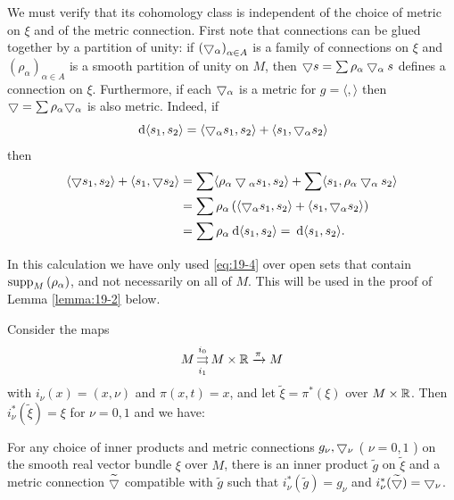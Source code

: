 We must verify that its cohomology class is independent of the choice of metric on $\xi$ and of the metric 
connection. First note that connections can be glued together by a partition of unity: 
if $\left(\bigtriangledown_{\alpha}\right)_{\alpha \in A}$ is a family of connections on $\xi$ 
and $\left(\rho_{\alpha}\right)_{\alpha \in A}$ is a smooth partition of unity on $M$, 
then $\bigtriangledown s=\sum \rho_{\alpha} \bigtriangledown_{\alpha} s$ defines a connection on $\xi$. Furthermore, if 
each $\bigtriangledown_\alpha$ is a metric for $g=\langle,\rangle$ then $\bigtriangledown=\sum \rho_{\alpha} \bigtriangledown_{\alpha}$ is also metric. 
Indeed, if
\begin{equation}\label{eq:19-4}
  \dd\langle s_{1}, s_{2}\rangle=\langle\btd{ }_{\alpha} s_{1}, s_{2}\rangle+\langle s_{1}, \btd{ }_{\alpha} s_{2}\rangle
\end{equation}
then
\[
  \begin{aligned}
    \langle\btd s_{1}, s_{2}\rangle+\langle s_{1}, \btd s_{2}\rangle 
      & = \sum\langle\rho_{\alpha} \btd{ }_{\alpha} s_{1}, s_{2}\rangle+\sum\langle s_{1}, \rho_{\alpha} \btd_{\alpha} s_{2}\rangle \\
      & = \sum \rho_{\alpha}\left(\langle\btd_{\alpha} s_{1}, s_{2}\rangle+\langle s_{1}, \btd{ }_{\alpha} s_{2}\rangle\right) \\
      & = \sum \rho_{\alpha} \dd\langle s_{1}, s_{2}\rangle=\dd\langle s_{1}, s_{2}\rangle .
  \end{aligned}
\]

In this calculation we have only used \eqref{eq:19-4} over open sets that contain $\mathrm{supp}_{M}\left(\rho_{\alpha}\right)$, and not 
necessarily on all of $M$. This will be used in the proof of Lemma \ref{lemma:19-2} below.

Consider the maps
\[
  M \mathop{\rightrightarrows}_{i_1}^{i_0}  M \times {\ensuremath{\mathbb{R}}} \xrightarrow{\pi} M
\]
with $i_{\nu}(x)=(x, \nu)$ and $\pi(x, t)=x$, and let $\tilde{\xi}=\pi^{*}(\xi)$ over $M \times \mathbb{R}$. 
Then $i_{\nu}^{*}(\tilde{\xi})=\xi$ for $\nu=0,1$ and we have:

\begin{lemma}\label{lemma:19-2}
  For any choice of inner products and metric connections $g_{\nu}, \bigtriangledown_{\nu}$ ( $\nu=0,1$ ) on the smooth real 
  vector bundle $\xi$ over $M$, there is an inner product $\widetilde{g}$ on $\widetilde{\xi}$ and a metric 
  connection $\widetilde{\bigtriangledown}$ compatible with $\widetilde{g}$ such that $i_{\nu}^{*}(\widetilde{g})=g_{\nu}$ 
  and $i_{\nu}^{*}(\widetilde{\bigtriangledown})=\bigtriangledown_{\nu}$.
\end{lemma}

